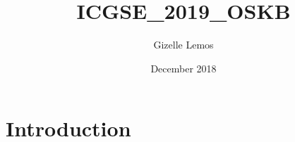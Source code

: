 \documentclass{article}
\title{ICGSE_2019_OSKB}
\author{Gizelle Lemos}
\date{December 2018}
\begin{document}
\maketitle

\section{Introduction}
\end{document}
